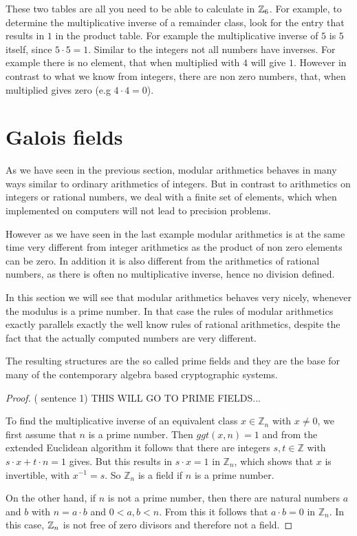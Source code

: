 \begin{example} 
These two tables are all you need to be able to calculate in $ \mathbb{Z}_6 $. For example, to determine the multiplicative inverse of a remainder class, look for the entry that results in $ 1 $ in the product table. For example the multiplicative inverse of $ 5 $ is $ 5 $ itself, since $5\cdot 5 = 1$. Similar to the integers not all numbers have inverses. For example there is no element, that when multiplied with $4$ will give $1$. 
However in contrast to what we know from integers, there are non zero numbers, that, when multiplied gives zero (e.g $4\cdot 4 =0$).
\end{example}

\section{Galois fields}
As we have seen in the previous section, modular arithmetics behaves in many ways similar to ordinary arithmetics of integers. But in contrast to arithmetics on integers or rational numbers, we deal with a finite set of elements, which when implemented on computers will not lead to precision problems.

However as we have seen in the last example modular arithmetics is at the same time very different from integer arithmetics as the product of non zero elements can be zero. In addition it is also different from the arithmetics of rational numbers, as there is often no multiplicative inverse, hence no division defined. 

In this section we will see that modular arithmetics behaves very nicely, whenever the modulus is a prime number. In that case the rules of modular arithmetics exactly parallels exactly the well know rules of rational arithmetics, despite the fact that the actually computed numbers are very different.

The resulting structures are the so called prime fields and they are the base for many of the contemporary algebra based cryptographic systems.


\begin{proof} (\cite{AL} sentence 1)  THIS WILL GO TO PRIME FIELDS...

To find the multiplicative inverse of an equivalent class $ x \in \mathbb{Z} _n $ with $ x \neq 0 $, we first assume that $ n $ is a prime number. Then $ ggt (x, n) = 1 $ and from the extended Euclidean algorithm it follows that there are integers $ s, t \in \mathbb{Z} $ with $ s \cdot x + t \cdot n = 1 $ gives. But this results in $ s \cdot x = 1 $ in $ \mathbb{Z} _n $, which shows that $ x $ is invertible, with $ x ^{- 1} = s $. So $ \mathbb{Z} _n $ is a field if $ n $ is a prime number.

On the other hand, if $ n $ is not a prime number, then there are natural numbers $ a $ and $ b $ with $ n = a \cdot b $ and $ 0 <a, b <n $. From this it follows that $ a \cdot b = 0 $ in $ \mathbb{Z} _n $. In this case, $ \mathbb{Z}_n $ is not free of zero divisors and therefore not a field.
\end{proof}


